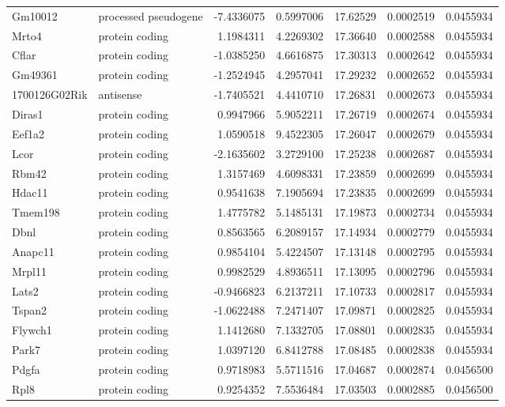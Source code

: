 \documentclass[onehalf,12pt]{beavtex}
\begin{document}
\begin{longtable}{llrrrrr}
  Gm10012 & processed pseudogene & -7.4336075 & 0.5997006 & 17.62529 & 0.0002519 & 0.0455934\\
  Mrto4 & protein coding & 1.1984311 & 4.2269302 & 17.36640 & 0.0002588 & 0.0455934\\
  \addlinespace
  Cflar & protein coding & -1.0385250 & 4.6616875 & 17.30313 & 0.0002642 & 0.0455934\\
  Gm49361 & protein coding & -1.2524945 & 4.2957041 & 17.29232 & 0.0002652 & 0.0455934\\
  1700126G02Rik & antisense & -1.7405521 & 4.4410710 & 17.26831 & 0.0002673 & 0.0455934\\
  Diras1 & protein coding & 0.9947966 & 5.9052211 & 17.26719 & 0.0002674 & 0.0455934\\
  Eef1a2 & protein coding & 1.0590518 & 9.4522305 & 17.26047 & 0.0002679 & 0.0455934\\
  \addlinespace
  Lcor & protein coding & -2.1635602 & 3.2729100 & 17.25238 & 0.0002687 & 0.0455934\\
  Rbm42 & protein coding & 1.3157469 & 4.6098331 & 17.23859 & 0.0002699 & 0.0455934\\
  Hdac11 & protein coding & 0.9541638 & 7.1905694 & 17.23835 & 0.0002699 & 0.0455934\\
  Tmem198 & protein coding & 1.4775782 & 5.1485131 & 17.19873 & 0.0002734 & 0.0455934\\
  Dbnl & protein coding & 0.8563565 & 6.2089157 & 17.14934 & 0.0002779 & 0.0455934\\
  \addlinespace
  Anapc11 & protein coding & 0.9854104 & 5.4224507 & 17.13148 & 0.0002795 & 0.0455934\\
  Mrpl11 & protein coding & 0.9982529 & 4.8936511 & 17.13095 & 0.0002796 & 0.0455934\\
  Lats2 & protein coding & -0.9466823 & 6.2137211 & 17.10733 & 0.0002817 & 0.0455934\\
  Tspan2 & protein coding & -1.0622488 & 7.2471407 & 17.09871 & 0.0002825 & 0.0455934\\
  Flywch1 & protein coding & 1.1412680 & 7.1332705 & 17.08801 & 0.0002835 & 0.0455934\\
  \addlinespace
  Park7 & protein coding & 1.0397120 & 6.8412788 & 17.08485 & 0.0002838 & 0.0455934\\
  Pdgfa & protein coding & 0.9718983 & 5.5711516 & 17.04687 & 0.0002874 & 0.0456500\\
  Rpl8 & protein coding & 0.9254352 & 7.5536484 & 17.03503 & 0.0002885 & 0.0456500\\

\end{longtable}
\end{document}
